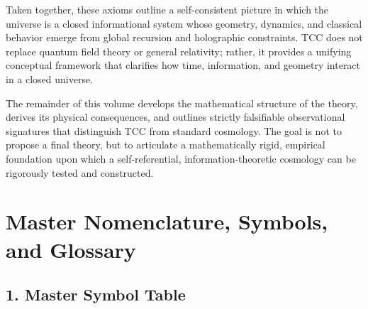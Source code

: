\documentclass[12pt,openany]{book}
\theoremstyle{plain}
\theoremstyle{definition}
\theoremstyle{remark}
\begin{document}
Taken together, these axioms outline a self-consistent picture in which the
universe is a closed informational system whose geometry, dynamics, and
classical behavior emerge from global recursion and holographic constraints.
TCC does not replace quantum field theory or general relativity; rather, it
provides a unifying conceptual framework that clarifies how time, information,
and geometry interact in a closed universe.

The remainder of this volume develops the mathematical structure of the theory,
derives its physical consequences, and outlines strictly falsifiable observational signatures that
distinguish TCC from standard cosmology. The goal is not to propose a final
theory, but to articulate a mathematically rigid, empirical foundation upon which a self-referential,
information-theoretic cosmology can be rigorously tested and constructed.


\chapter{Master Nomenclature, Symbols, and Glossary}

\section*{1. Master Symbol Table}
\end{document}

